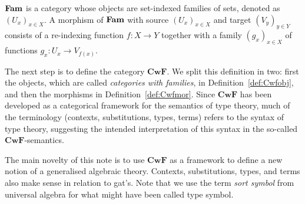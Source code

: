 \documentclass{lmcs}
\def\Cwf{\mathbf{CwF}}
\begin{document}
\begin{definition}\label{def:catFam}
$\textbf{Fam}$ is a category whose objects are
set-indexed families of sets, denoted as $(U_x)_{x\in X}$.
A morphism of $\textbf{Fam}$ with source $(U_x)_{x\in X}$ and target $(V_y)_{y\in Y}$
consists of a re-indexing function $f: X\to Y$ together with a family
$(g_x)_{x\in X}$ of functions $g_x : U_x \to V_{f(x)}$. %
\end{definition}

The next step is to define the category $\Cwf$. 
We split this definition in two: first the objects, 
which are called \emph{categories with families}, in Definition~\ref{def:Cwfobj},
and then the morphisms in Definition~\ref{def:Cwfmor}. 
Since $\Cwf$ has been developed as a categorical framework for the semantics of
type theory, much of the terminology (contexts, substitutions,
types, terms) refers to the syntax of type theory, 
suggesting the intended interpretation of this syntax in the 
so-called $\Cwf$-semantics.

The main novelty of this note is to use $\Cwf$ as a framework
to define a new notion of a generalised algebraic theory. 
Contexts, substitutions, types, and terms also make
sense in relation to gat's. Note that we use the term {\em sort symbol} from universal algebra for what might have been called type symbol.
\end{document}
